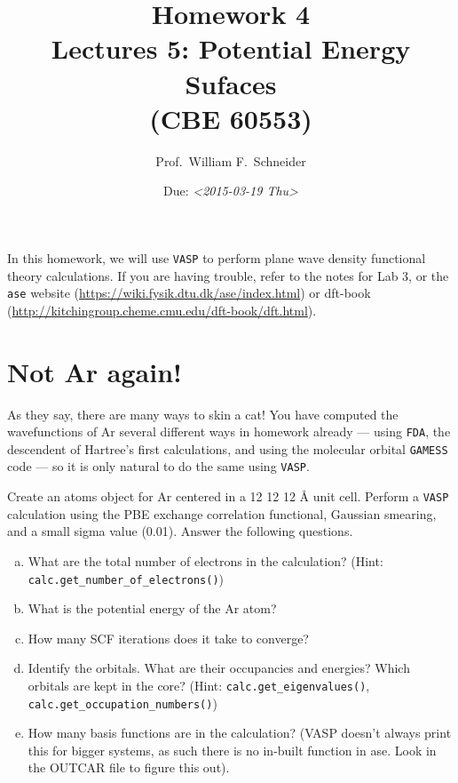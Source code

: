 \documentclass[11pt]{article}
\date{Due: \textit{<2015-03-19 Thu>}}
\title{}
\begin{document}
\title{Homework 4\\Lectures 5: Potential Energy Sufaces\\(CBE 60553)}
\author{Prof.\ William F.\ Schneider}
\maketitle


In this homework, we will use \texttt{VASP} to perform plane wave density functional theory calculations. If you are having trouble, refer to the notes for Lab 3, or the \texttt{ase} website (\url{https://wiki.fysik.dtu.dk/ase/index.html}) or dft-book (\url{http://kitchingroup.cheme.cmu.edu/dft-book/dft.html}).

\section{Not Ar again! \label{sec:Ar}}
\label{sec-1}

As they say, there are many ways to skin a cat! You have computed the wavefunctions of Ar several different ways in homework already — using \texttt{FDA}, the descendent of Hartree’s first calculations, and using the molecular orbital \texttt{GAMESS} code — so it is only natural to do the same using \texttt{VASP}. 

Create an atoms object for Ar centered in a 12 \texttimes{} 12 \texttimes{} 12 \AA{} unit cell. Perform a \texttt{VASP} calculation using the PBE exchange correlation functional, Gaussian smearing, and a small sigma value (0.01). Answer the following questions.

\begin{enumerate}[(a)]
\item What are the total number of electrons in the calculation? (Hint: \verb~calc.get_number_of_electrons()~)

\item What is the potential energy of the Ar atom?

\item How many SCF iterations does it take to converge?

\item Identify the orbitals. What are their occupancies and energies? Which orbitals are kept in the core? (Hint: \verb~calc.get_eigenvalues()~, \verb~calc.get_occupation_numbers()~)

\item How many basis functions are in the calculation? (VASP doesn't always print this for bigger systems, as such there is no in-built function in ase. Look in the OUTCAR file to figure this out).
\end{enumerate}
\end{document}
